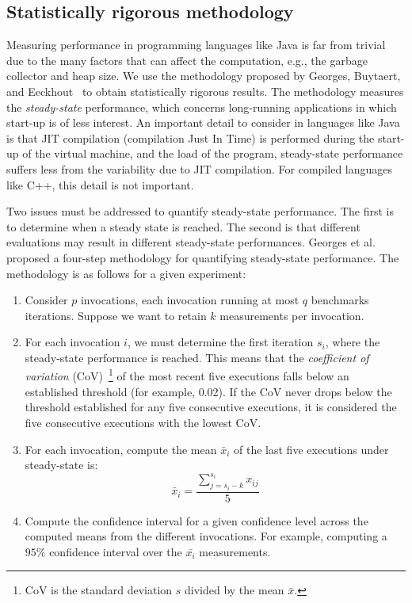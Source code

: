 \subsection{\label{subsec:stat-rigor-meth}Statistically rigorous methodology}

Measuring performance in programming languages like Java is far from trivial due to the many factors that can affect the computation, e.g., the garbage collector and heap size. We use the methodology proposed by Georges, Buytaert, and Eeckhout~\cite{DBLP_conf_oopsla_GeorgesBE07} to obtain statistically rigorous results.  The methodology measures the \textit{steady-state} performance, which concerns long-running applications in which start-up is of less interest. An important detail to consider in languages like Java is that JIT  compilation (compilation Just In Time) is performed during the start-up of the virtual machine, and the load of the program, steady-state performance suffers less from the variability due to JIT compilation. For compiled languages like C++, this detail is not important.

Two issues must be addressed to quantify steady-state performance. The first is to determine when a steady state is reached. The second is that different evaluations may result in different steady-state performances. Georges et al. proposed a four-step methodology for quantifying steady-state performance. The methodology is as follows for a given experiment:

\begin{enumerate}
    \item Consider \(p\) invocations, each invocation running at most \(q\) benchmarks iterations. Suppose we want to retain \(k\) measurements per invocation.
    \item For each invocation \(i\), we must determine the first iteration \(s_i\), where the steady-state performance is reached. This means that the \textit{coefficient of variation} (CoV)~\footnote{CoV is the standard deviation \(s\) divided by the mean \(\bar{x}\).} of the most recent five {executions} falls below an established threshold (for example, 0.02). If the CoV never drops below the threshold established for any five consecutive {executions}, it is considered the five consecutive {executions} with the lowest CoV.
    \item For each invocation, compute the mean \(\bar{x}_i\) of the last five {executions} under steady-state is:
    \begin{equation*}
      \bar{x}_i = \frac{\sum^{s_i}_{j=s_i - k}x_{ij}}{5}
    \end{equation*}
    \item Compute the confidence interval for a given confidence level across the computed means from the different invocations. For example, computing a \(95\%\) confidence interval over the \(\bar{x_i}\) measurements.
\end{enumerate}

